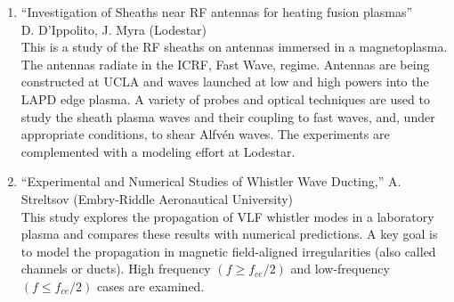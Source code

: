 \documentclass[11pt]{article}
\begin{document}
\begin{enumerate}


\item ``Investigation of Sheaths near RF antennas for heating fusion plasmas''\\ D.
  D'Ippolito, J. Myra (Lodestar)\\ This is a study of the RF sheaths on antennas
  immersed in a magnetoplasma. The antennas radiate in the ICRF, Fast
  Wave, regime. Antennas are being constructed at UCLA and waves
  launched at low and high powers into the LAPD edge plasma. A variety
  of probes and optical techniques are used to study the sheath
  plasma waves and their coupling to fast waves, and, under appropriate
  conditions, to shear Alfv\'{e}n waves. The experiments are
  complemented with a modeling effort at Lodestar.\\

\item ``Experimental and Numerical Studies of Whistler Wave Ducting,''
  A. Streltsov (Embry-Riddle Aeronautical University)\\ This study explores
   the propagation of VLF whistler modes in a
  laboratory plasma and compares these results with numerical
  predictions. A key goal is to model the propagation in magnetic
  field-aligned irregularities (also called channels or ducts). High
  frequency $(f \ge f_{ce}/2)$ and low-frequency $(f \le f_{ce}/2)$
  cases are examined.





\end{enumerate}
\end{document}
